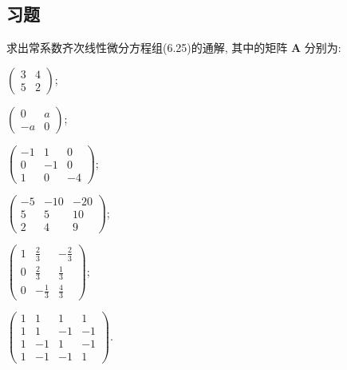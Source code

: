 \subsection{习题}



\begin{exercise}
  求出常系数齐次线性微分方程组(6.25)的通解, 其中的矩阵 $\bm{A}$ 分别为:
  \begin{mathtasks2}
    \item $\displaystyle\begin{pmatrix}3&4\\5&2\end{pmatrix}$;
    \item $\displaystyle\begin{pmatrix}0&a\\-a&0\end{pmatrix}$;
    \item $\displaystyle\begin{pmatrix}-1&1&0\\0&-1&0\\1&0&-4\end{pmatrix}$;
    \item $\displaystyle\begin{pmatrix}-5&-10&-20\\5&5&10\\2&4&9\end{pmatrix}$;
    \item $\displaystyle\begin{pmatrix}1&\frac{2}{3}&-\frac{2}{3}\\0&\frac{2}{3}&\frac{1}{3}\\0&-\frac{1}{3}&\frac{4}{3}\end{pmatrix}$;
    \item $\displaystyle\begin{pmatrix}1&1&1&1\\1&1&-1&-1\\1&-1&1&-1\\1&-1&-1&1\end{pmatrix}$.
  \end{mathtasks2}
\end{exercise}

